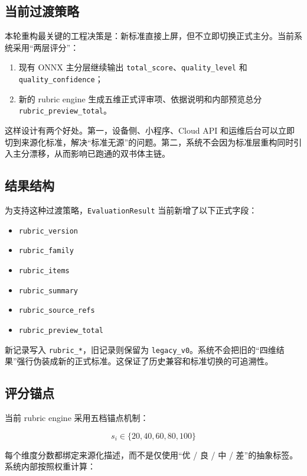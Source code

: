 \documentclass[UTF8,a4paper,12pt,fontset=none]{ctexart}
\begin{document}
\subsection{当前过渡策略}
本轮重构最关键的工程决策是：新标准直接上屏，但不立即切换正式主分。当前系统采用“两层评分”：

\begin{enumerate}
  \item 现有 ONNX 主分层继续输出 \texttt{total\_score}、\texttt{quality\_level} 和 \texttt{quality\_confidence}；
  \item 新的 rubric engine 生成五维正式评审项、依据说明和内部预览总分 \texttt{rubric\_preview\_total}。
\end{enumerate}

这样设计有两个好处。第一，设备侧、小程序、Cloud API 和运维后台可以立即切到来源化标准，解决“标准无源”的问题。第二，系统不会因为标准层重构同时引入主分漂移，从而影响已跑通的双书体主链。

\subsection{结果结构}
为支持这种过渡策略，\texttt{EvaluationResult} 当前新增了以下正式字段：

\begin{itemize}
  \item \texttt{rubric\_version}
  \item \texttt{rubric\_family}
  \item \texttt{rubric\_items}
  \item \texttt{rubric\_summary}
  \item \texttt{rubric\_source\_refs}
  \item \texttt{rubric\_preview\_total}
\end{itemize}

新记录写入 \texttt{rubric\_*}，旧记录则保留为 \texttt{legacy\_v0}。系统不会把旧的“四维结果”强行伪装成新的正式标准。这保证了历史兼容和标准切换的可追溯性。

\subsection{评分锚点}
当前 rubric engine 采用五档锚点机制：

\begin{equation}
s_i \in \{20, 40, 60, 80, 100\}
\end{equation}

每个维度分数都绑定来源化描述，而不是仅使用“优 / 良 / 中 / 差”的抽象标签。系统内部按照权重计算：
\end{document}

